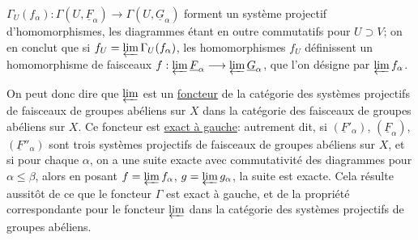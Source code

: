 $\Gamma_U(f_\alpha):\Gamma(U,\underline F_\alpha)\longrightarrow\Gamma(U,\underline G_\alpha)$ forment un système projectif d'homomorphismes, les diagrammes
étant en outre commutatifs pour $U\supset V$; on en conclut que si $f_U=\varprojlim\Gamma_U(f_\alpha)$, les homomorphismes $f_U$ définissent un homomorphisme de faisceaux $f:\varprojlim\underline F_\alpha\longrightarrow\varprojlim\underline G_\alpha$, que l'on désigne par $\varprojlim f_\alpha$.

On peut donc dire que $\varprojlim$ est un \uline{foncteur} de la catégorie des systèmes projectifs de faisceaux de groupes abéliens sur $X$ dans la catégorie des faisceaux de groupes abéliens sur $X$. Ce foncteur est \uline{exact à gauche}: autrement dit, si  $(\underline F'_\alpha)$, $(\underline F_\alpha)$, $(\underline F''_\alpha)$ sont trois systèmes projectifs de faisceaux de groupes abéliens sur $X$, et si pour chaque $\alpha$, on a une suite exacte avec commutativité des diagrammes
pour $\alpha\leq\beta$, alors en posant $f=\varprojlim f_\alpha$, $g=\varprojlim g_\alpha$, la suite
est exacte. Cela résulte aussitôt de ce que le foncteur $\Gamma$ est exact à gauche, et de la propriété correspondante pour le foncteur $\varprojlim$ dans la catégorie des systèmes projectifs de groupes abéliens.

